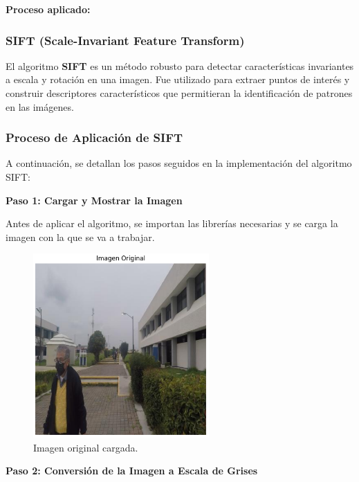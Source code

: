 \documentclass[a4paper]{article}
\begin{document}
\textbf{Proceso aplicado:}


\subsubsection{SIFT (Scale-Invariant Feature Transform)}

El algoritmo \textbf{SIFT} es un método robusto para detectar características invariantes a escala y rotación en una imagen. Fue utilizado para extraer puntos de interés y construir descriptores característicos que permitieran la identificación de patrones en las imágenes.

\subsubsection{Proceso de Aplicación de SIFT}

A continuación, se detallan los pasos seguidos en la implementación del algoritmo SIFT:
\par\vspace{0.5cm}

\textbf{Paso 1: Cargar y Mostrar la Imagen}
\par\vspace{0.5cm}

Antes de aplicar el algoritmo, se importan las librerías necesarias y se carga la imagen con la que se va a trabajar.

\begin{figure}[H]
    \centering
    \includegraphics[width=0.6\textwidth]{images/sift_paso_1.png}
    \caption{Imagen original cargada.}
\end{figure}

\textbf{Paso 2: Conversión de la Imagen a Escala de Grises}
\end{document}

